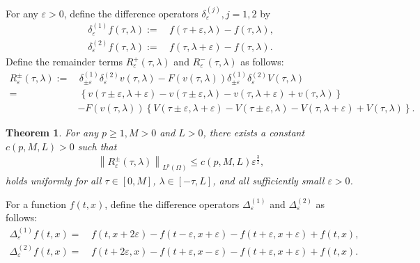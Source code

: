 \documentclass[11pt,reqno]{amsart}
\numberwithin{equation}{section}
\newtheorem{theorem}{Theorem}[section]
\newcommand{\1}{{\bf 1}}
\newcommand{\2}{{\bf 2}}
\begin{document}
 For  any $\varepsilon > 0$, define the difference operators $\delta_{\varepsilon}^{(j)}, j=1, 2$  by  
\begin{equation}\label{eq diff}
 \begin{split}
 \delta_{\varepsilon}^{(1)}f(\tau, \lambda):=&\, f(\tau+\varepsilon, \lambda)-f(\tau, \lambda),\\
   \delta_{\varepsilon}^{(2)}f(\tau, \lambda):=&\, f(\tau, \lambda+\varepsilon)-f(\tau, \lambda).
 \end{split}
 \end{equation} 
Define the remainder terms $R_{\varepsilon}^+(\tau, \lambda)$ and $R_{\varepsilon}^-(\tau, \lambda)$ as follows:  
 \begin{equation}\label{eq R}
\begin{split}
 R_{\varepsilon}^{\pm}(\tau, \lambda) := & \,\delta_{\pm\varepsilon}^{(1)}\delta_{\varepsilon}^{(2)}v(\tau, \lambda)-F(v(\tau, \lambda))\delta_{\pm\varepsilon}^{(1)}\delta_{\varepsilon}^{(2)}V(\tau, \lambda)\\
=&\, \left\{ v(\tau\pm\varepsilon, \lambda+\varepsilon)-v(\tau\pm\varepsilon, \lambda) - v(\tau, \lambda+\varepsilon)+v(\tau, \lambda)\right\}\\
&-F(v(\tau, \lambda))\left\{V(\tau\pm\varepsilon, \lambda+\varepsilon)-V(\tau\pm\varepsilon, \lambda)-V(\tau, \lambda+\varepsilon)+V(\tau, \lambda) \right\}.
\end{split}
\end{equation}

      \begin{theorem}\label{thm error 1}   For any $p \ge 1, M>0$ and $L>0$, there exists a constant $c(p, M, L)>0$ such that 
\begin{align}\label{eq error}
\left\| R_{\varepsilon}^{\pm}(\tau, \lambda)\right\|_{L^p(\Omega)} \le c(p, M, L)\varepsilon^{ \frac{3}{2}},
\end{align}
holds uniformly for all $\tau \in [0, M]$, $\lambda \in [-\tau, L]$,  and  all sufficiently small $\varepsilon > 0$.
\end{theorem}
 
  
  For a   function $f(t, x)$, define    the difference operators $\Delta_{\varepsilon}^{(1)}$ and $\Delta_{\varepsilon}^{(2)}$  as follows:
\begin{equation}\label{eq Delta1-2}
\begin{split}
\Delta_{\varepsilon}^{(1)}f(t,x)=&\, f(t,x+2\varepsilon)-f(t-\varepsilon, x+\varepsilon)-f(t+\varepsilon, x+\varepsilon)+f(t,x),\\
\Delta_{\varepsilon}^{(2)}f(t,x)=&\, f(t+2\varepsilon, x)-f(t+\varepsilon, x-\varepsilon)-f(t+\varepsilon, x+\varepsilon)+f(t,x).
\end{split}
\end{equation} 
  
\end{document}
